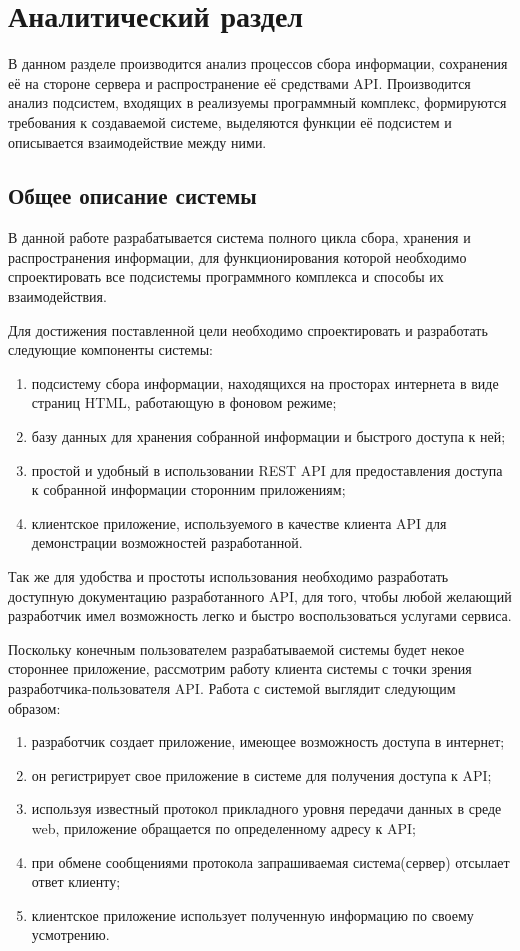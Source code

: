 \chapter{Аналитический раздел}
\label{cha:analysis}
%
%
В данном разделе производится анализ процессов сбора информации, сохранения её на стороне сервера и распространение её средствами API.
Производится анализ подсистем, входящих в реализуемы программный комплекс, формируются требования к создаваемой системе, выделяются функции её подсистем и описывается взаимодействие между ними.

\section{Общее описание системы}
В данной работе разрабатывается система полного цикла сбора, хранения и распространения информации, для функционирования которой необходимо спроектировать все подсистемы программного комплекса и способы их взаимодействия.

Для достижения поставленной цели необходимо спроектировать и разработать следующие компоненты системы:

\begin{enumerate}
\item подсистему сбора информации, находящихся на просторах интернета в виде страниц HTML, работающую в фоновом режиме;
\item базу данных для хранения собранной информации и быстрого доступа к ней;
\item простой и удобный в использовании REST API для предоставления доступа к собранной информации сторонним приложениям;
\item клиентское приложение, используемого в качестве клиента API для демонстрации возможностей разработанной.
\end{enumerate}

Так же для удобства и простоты использования необходимо разработать доступную документацию разработанного API, для того, чтобы любой желающий разработчик имел возможность легко и быстро воспользоваться услугами сервиса. 

Поскольку конечным пользователем разрабатываемой системы будет некое стороннее приложение, рассмотрим работу клиента системы с точки зрения разработчика-пользователя API. Работа с системой выглядит следующим образом:

\begin{enumerate}
\item разработчик создает приложение, имеющее возможность доступа в интернет;
\item он регистрирует свое приложение в системе для получения доступа к API;
\item используя известный протокол прикладного уровня передачи данных в среде web, приложение обращается по определенному адресу к API;
\item при обмене сообщениями протокола запрашиваемая система(сервер) отсылает ответ клиенту;
\item клиентское приложение использует полученную информацию по своему усмотрению.
\end{enumerate}

